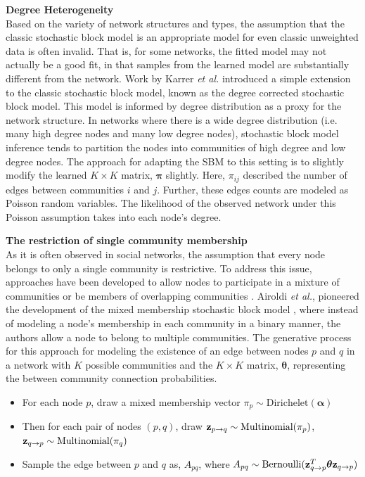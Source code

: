 {\bf Degree Heterogeneity}\\
\indent Based on the variety of network structures and types, the assumption that the classic stochastic block model is an appropriate model for even classic unweighted data is often invalid. That is, for some networks, the fitted model may not actually be a good fit, in that samples from the learned model are substantially different from the network. Work by Karrer \emph{et al.} \cite{degreecorrectSBM} introduced a simple extension to the classic stochastic block model, known as the degree corrected stochastic block model. This model is informed by degree distribution as a proxy for the network structure. In networks where there is a wide degree distribution (i.e. many high degree nodes and many low degree nodes), stochastic block model inference tends to partition the nodes into communities of high degree and low degree nodes. The approach for adapting the SBM to this setting is to slightly modify the learned $K \times K$ matrix, ${\boldsymbol \pi}$ slightly. Here, $\pi_{ij}$ described the number of edges between communities $i$ and $j$. Further, these edges counts are modeled as Poisson random variables. The likelihood of the observed network under this Poisson assumption takes into each node's degree. 

{\bf The restriction of single community membership}\\
\indent As it is often observed in social networks, the assumption that every node belongs to only a single community is restrictive. To address this issue, approaches have been developed to  allow nodes to  participate in a mixture of communities \cite{mixMember} or be members of overlapping communities \cite{LA}. Airoldi \emph{et al.}, pioneered the development of the mixed membership stochastic block model \cite{mixMember}, where instead of modeling a node's membership in each community in a binary manner, the authors allow a node to belong to multiple communities. The generative process for this approach for modeling the existence of an edge between nodes $p$ and $q$ in a network with $K$ possible communities and the $K \times K$ matrix, ${\boldsymbol \theta}$, representing the between community connection probabilities.

\begin{itemize}
\item For each node $p$, draw a mixed membership vector $\pi_{p}\sim \text{Dirichelet}({\boldsymbol \alpha})$
\item Then for each pair of nodes $(p,q)$, draw ${\bf z}_{p\rightarrow q} \sim \text{Multinomial}(\pi_{p})$, ${\bf z}_{q\rightarrow p} \sim \text{Multinomial}(\pi_{q})$
\item Sample the edge between $p$ and $q$ as, $A_{pq}$, where $A_{pq} \sim \text{Bernoulli}({\bf z}_{q\rightarrow p}^{T}{\boldsymbol \theta}{\bf z}_{q\rightarrow p})$
\end{itemize} 

